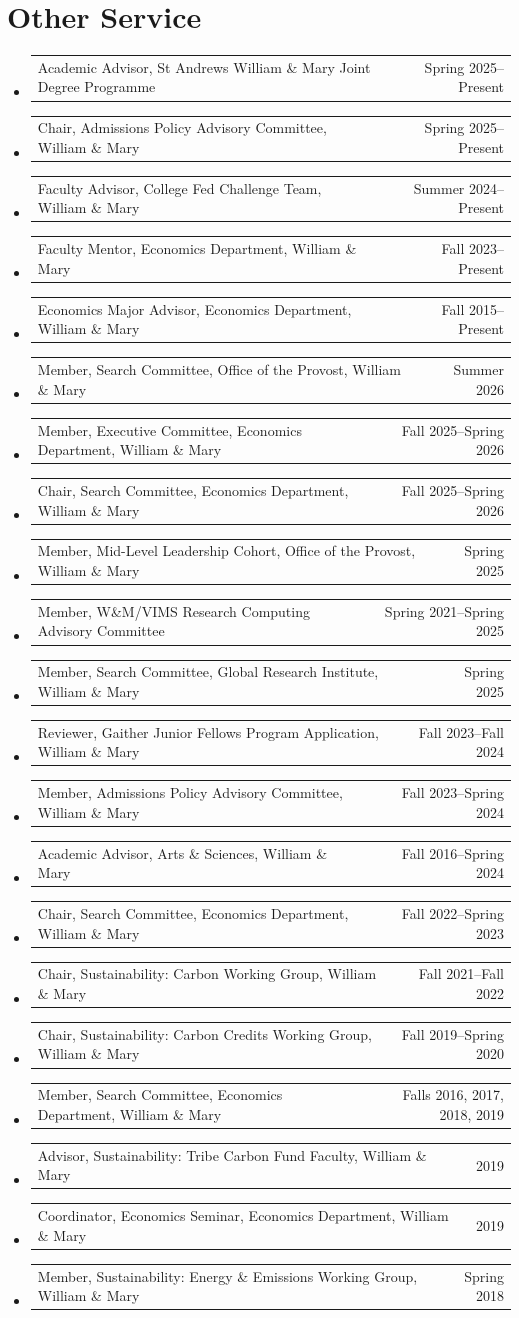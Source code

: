 \documentclass[10pt,letterpaper,en-US]{article}
\makeatletter
\newcommand{\itemrow}[2]
{\begin{tabular*}{\linewidth}{l@{\extracolsep{\fill}}r}
	#1 & #2 \\
\end{tabular*}}
\makeatother
\begin{document}
\section*{Other Service}
\begin{itemize}
    \item \itemrow{Academic Advisor, St Andrews William \& Mary Joint Degree Programme}{Spring 2025--Present}
    \item \itemrow{Chair, Admissions Policy Advisory Committee, William \& Mary}{Spring 2025--Present}
    \item \itemrow{Faculty Advisor, College Fed Challenge Team, William \& Mary}{Summer 2024--Present}
    \item \itemrow{Faculty Mentor, Economics Department, William \& Mary}{Fall 2023--Present}
    \item \itemrow{Economics Major Advisor, Economics Department, William \& Mary}{Fall 2015--Present}
    \item \itemrow{Member, Search Committee, Office of the Provost, William \& Mary}{Summer 2026}
    \item \itemrow{Member, Executive Committee, Economics Department, William \& Mary}{Fall 2025--Spring 2026}
    \item \itemrow{Chair, Search Committee, Economics Department, William \& Mary}{Fall 2025--Spring 2026}
    \item \itemrow{Member, Mid-Level Leadership Cohort, Office of the Provost, William \& Mary}{Spring 2025}
    \item \itemrow{Member, W\&M/VIMS Research Computing Advisory Committee}{Spring 2021--Spring 2025}
    \item \itemrow{Member, Search Committee, Global Research Institute, William \& Mary}{Spring 2025}
    \item \itemrow{Reviewer, Gaither Junior Fellows Program Application, William \& Mary}{Fall 2023--Fall 2024}
    \item \itemrow{Member, Admissions Policy Advisory Committee, William \& Mary}{Fall 2023--Spring 2024}
    \item \itemrow{Academic Advisor, Arts \& Sciences, William \& Mary}{Fall 2016--Spring 2024}
    \item \itemrow{Chair, Search Committee, Economics Department, William \& Mary}{Fall 2022--Spring 2023}
    \item \itemrow{Chair, Sustainability: Carbon Working Group, William \& Mary}{Fall 2021--Fall 2022}
    \item \itemrow{Chair, Sustainability: Carbon Credits Working Group, William \& Mary}{Fall 2019--Spring 2020}
    \item \itemrow{Member, Search Committee, Economics Department, William \& Mary}{Falls 2016, 2017, 2018, 2019}
    \item \itemrow{Advisor, Sustainability: Tribe Carbon Fund Faculty, William \& Mary}{2019}
    \item \itemrow{Coordinator, Economics Seminar, Economics Department, William \& Mary}{2019}
    \item \itemrow{Member, Sustainability: Energy \& Emissions Working Group, William \& Mary}{Spring 2018}
\end{itemize}
\end{document}
